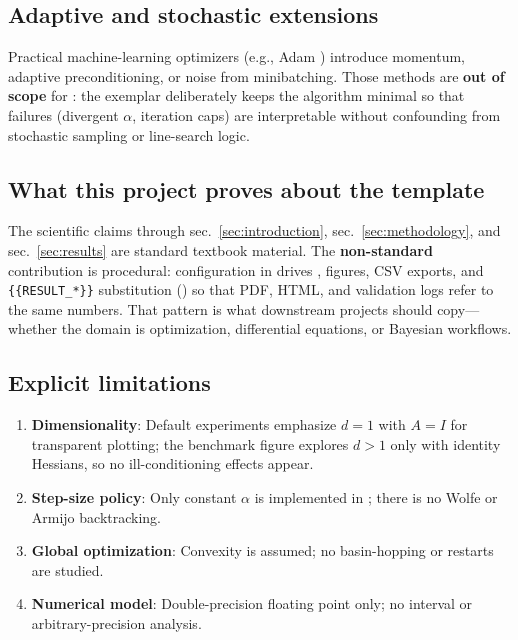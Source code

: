 \documentclass[
  english,
]{article}
\providecommand{\tightlist}{%
  \setlength{\itemsep}{0pt}\setlength{\parskip}{0pt}}
\begin{document}
\subsection{Adaptive and stochastic
extensions}\label{adaptive-and-stochastic-extensions}

Practical machine-learning optimizers (e.g., Adam
\citep{kingma2014adam}) introduce momentum, adaptive preconditioning, or
noise from minibatching. Those methods are \textbf{out of scope} for
: the exemplar deliberately keeps the
algorithm minimal so that failures (divergent \(\alpha\), iteration
caps) are interpretable without confounding from stochastic sampling or
line-search logic.

\subsection{What this project proves about the
template}\label{what-this-project-proves-about-the-template}

The scientific claims through sec.~\ref{sec:introduction},
sec.~\ref{sec:methodology}, and sec.~\ref{sec:results} are standard
textbook material. The \textbf{non-standard} contribution is procedural:
configuration in  drives
, figures, CSV exports, and
\texttt{\{\{RESULT\_*\}\}} substitution
() so that PDF,
HTML, and validation logs refer to the same numbers. That pattern is
what downstream projects should copy---whether the domain is
optimization, differential equations, or Bayesian workflows.

\subsection{Explicit limitations}\label{explicit-limitations}

\begin{enumerate}
\def\labelenumi{\arabic{enumi}.}
\tightlist
\item
  \textbf{Dimensionality}: Default experiments emphasize \(d = 1\) with
  \(A = I\) for transparent plotting; the benchmark figure explores
  \(d > 1\) only with identity Hessians, so no ill-conditioning effects
  appear.
\item
  \textbf{Step-size policy}: Only constant \(\alpha\) is implemented in
  ; there is no Wolfe or Armijo backtracking.
\item
  \textbf{Global optimization}: Convexity is assumed; no basin-hopping
  or restarts are studied.
\item
  \textbf{Numerical model}: Double-precision floating point only; no
  interval or arbitrary-precision analysis.
\end{enumerate}
\end{document}
